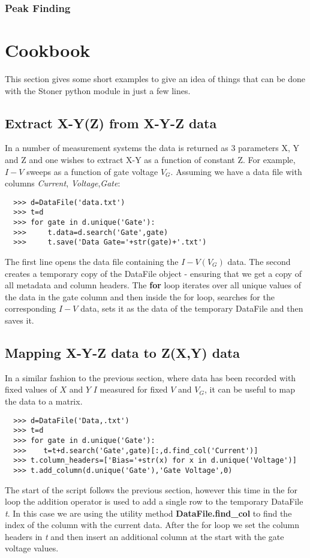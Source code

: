 \documentclass[a4paper,11pt]{scrartcl}
\begin{document}
\subsubsection{Peak Finding}

\section{Cookbook}

This section gives some short examples to give an idea of things that can be
done with the Stoner python module in just a few lines.

\subsection{Extract X-Y(Z) from X-Y-Z data}

In a number of measurement systems the data is returned as 3 parameters X, Y and
Z and one wishes to extract X-Y as a function of constant Z. For example, $I-V$
sweeps as a function of gate voltage $V_G$. Assuming we have a data file with
columns \textit{Current}, \textit{Voltage},\textit{Gate}:

\begin{verbatim}
  >>> d=DataFile('data.txt')
  >>> t=d
  >>> for gate in d.unique('Gate'):
  >>>     t.data=d.search('Gate',gate)
  >>>     t.save('Data Gate='+str(gate)+'.txt')
\end{verbatim}

The first line opens the data file containing the $I-V(V_G)$ data. The second
creates a temporary copy of the DataFile object - ensuring that we get a copy of
all metadata and column headers. The \textbf{for} loop iterates over all unique
values of the data in the gate column and then inside the for loop, searches for
the corresponding $I-V$ data, sets it as the data of the temporary DataFile and
then saves it.

\subsection{Mapping X-Y-Z data to Z(X,Y) data}

In a similar fashion to the previous section, where data has been recorded with
fixed values of $X$ and $Y$ \eg $I$ measured for fixed $V$ and $V_G$, it can be
useful to map the data to a matrix.

\begin{verbatim}
  >>> d=DataFile('Data,.txt')
  >>> t=d
  >>> for gate in d.unique('Gate'):
  >>>    t=t+d.search('Gate',gate)[:,d.find_col('Current')]
  >>> t.column_headers=['Bias='+str(x) for x in d.unique('Voltage')]
  >>> t.add_column(d.unique('Gate'),'Gate Voltage',0)
\end{verbatim}

The start of the script follows the previous section, however this time in the
for loop the addition operator is used to add a single row to the temporary
DataFile \textit{t}. In this case we are using the utility method
\textbf{DataFile.find\_col} to find the index of the column with the current
data. After the for loop we set the column headers in \textit{t} and then insert
an additional column at the start with the gate voltage values.
\end{document}
